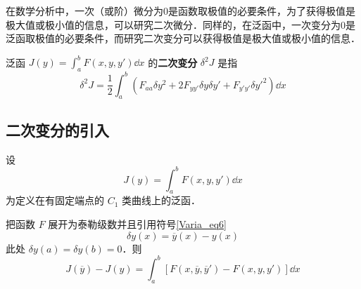 
\begin{issues}
\issueTODO
\end{issues}

在数学分析中，一次（或阶）微分为0是函数取极值的必要条件，为了获得极值是极大值或极小值的信息，可以研究二次微分．同样的，在泛函中，一次变分为0是泛函取极值的必要条件，而研究二次变分可以获得极值是极大值或极小值的信息．

泛函 $J(y)=\int_a^bF(x,y,y')\dd x$ 的\textbf{二次变分} $\delta^2J$ 是指
\begin{equation}
\delta^2J=\frac{1}{2}\int_a^b(F_{aa}\delta y^2+2F_{yy'}\delta y\delta y'+F_{y'y'}\delta y'^2)\dd x
\end{equation}
\subsection{二次变分的引入}
设 
\begin{equation}
J(y)=\int_a^bF(x,y,y')\dd x
\end{equation}
为定义在有固定端点的 $C_1$ 类曲线上的泛函．

把函数 $F$ 展开为泰勒级数并且引用符号\autoref{Varia_eq6}~
\begin{equation}
\delta y(x)=\overline{y}(x)-y(x)
\end{equation}
此处 $\delta y(a)=\delta y(b)=0$．则
\begin{equation}
J(\overline{y})-J(y)=\int_a^b[F(x,\overline{y},\overline{y}')-F(x,y,y')]\dd x
\end{equation}
